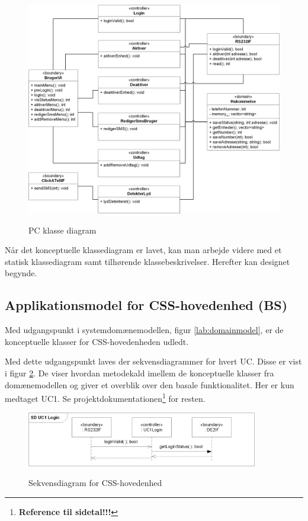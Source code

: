 \clearpage
\begin{figure}[htbp] \centering
{\includegraphics[width=\textwidth]{billeder/uml/PC_class}}
\caption{PC klasse diagram}
\label{lab: PC klasse diagram}
\end{figure}

Når det konceptuelle klassediagram er lavet, kan man arbejde  videre med et statisk klassediagram samt tilhørende klassebeskrivelser. Herefter kan designet begynde. 

%
%
\subsection{Applikationsmodel for CSS-hovedenhed (BS)}
Med udgangspunkt i systemdomænemodellen, figur \ref{lab:domainmodel}, er de konceptuelle klasser for CSS-hovedenheden udledt. 

Med dette udgangspunkt laves der sekvensdiagrammer for hvert UC. Disse er vist i figur \ref{fig:CSS_hovedenhed_sd}. De viser hvordan metodekald imellem de konceptuelle klasser fra domænemodellen og giver et overblik over den basale funktionalitet. Her er kun medtaget UC1. Se projektdokumentationen\footnote{\textbf{Reference til sidetal!!!}} for resten.

\begin{figure}[!htb]
     \centering
     { \includegraphics[width=0.9\textwidth]{Billeder/UML/CSS_hovedenhed_SD}}
     \caption{Sekvensdiagram for CSS-hovedenhed}
     \label{fig:CSS_hovedenhed_sd}
\end{figure}


